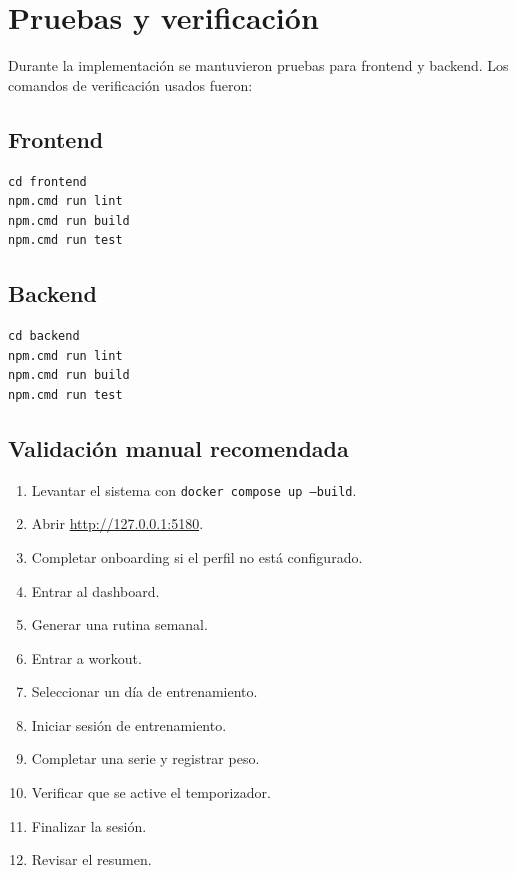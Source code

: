 \documentclass[12pt,a4paper]{article}
\begin{document}
\section{Pruebas y verificación}

Durante la implementación se mantuvieron pruebas para frontend y backend. Los comandos de verificación usados fueron:

\subsection{Frontend}

\begin{lstlisting}
cd frontend
npm.cmd run lint
npm.cmd run build
npm.cmd run test
\end{lstlisting}

\subsection{Backend}

\begin{lstlisting}
cd backend
npm.cmd run lint
npm.cmd run build
npm.cmd run test
\end{lstlisting}

\subsection{Validación manual recomendada}

\begin{enumerate}
    \item Levantar el sistema con \texttt{docker compose up --build}.
    \item Abrir \url{http://127.0.0.1:5180}.
    \item Completar onboarding si el perfil no está configurado.
    \item Entrar al dashboard.
    \item Generar una rutina semanal.
    \item Entrar a workout.
    \item Seleccionar un día de entrenamiento.
    \item Iniciar sesión de entrenamiento.
    \item Completar una serie y registrar peso.
    \item Verificar que se active el temporizador.
    \item Finalizar la sesión.
    \item Revisar el resumen.
\end{enumerate}
\end{document}
